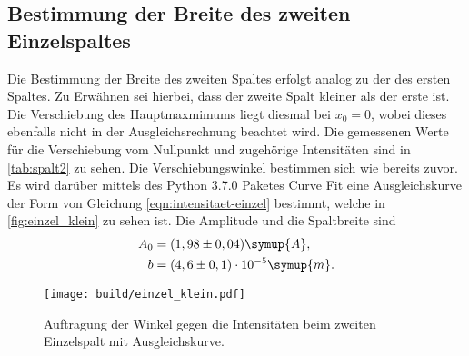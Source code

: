 \subsection{Bestimmung der Breite des zweiten Einzelspaltes}
    Die Bestimmung der Breite des zweiten Spaltes erfolgt analog zu der des ersten Spaltes. Zu Erwähnen sei hierbei, dass der zweite Spalt kleiner 
    als der erste ist. Die Verschiebung des Hauptmaxmimums liegt diesmal bei $x_0 = 0$, wobei dieses ebenfalls nicht in der Ausgleichsrechnung
    beachtet wird. Die gemessenen Werte für die Verschiebung vom Nullpunkt und zugehörige Intensitäten sind 
    in \autoref{tab:spalt2} zu sehen. Die Verschiebungswinkel bestimmen sich wie bereits zuvor.
    Es wird darüber mittels des Python 3.7.0 Paketes Curve Fit eine Ausgleichskurve der Form von Gleichung 
    \eqref{eqn:intensitaet-einzel} bestimmt, welche in \autoref{fig:einzel_klein} zu sehen ist. Die Amplitude und die Spaltbreite sind 
    \begin{align*}
        A_0 &= (1,98 \pm 0,04) \symup{A}, \\
        b &= (4,6 \pm 0,1) \cdot 10^{-5} \symup{m}. 
    \end{align*}
    
    \begin{figure}
        \centering
        \texttt{[image: build/einzel\_klein.pdf]}
        \caption{Auftragung der Winkel gegen die Intensitäten beim zweiten Einzelspalt mit Ausgleichskurve.}
        \label{fig:einzel_klein}
    \end{figure}

